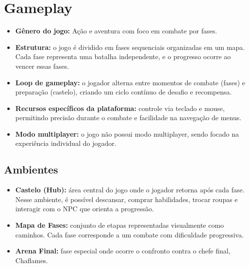\documentclass[12pt,a4paper]{article}
\begin{document}
\newpage


\section*{Gameplay}

\begin{itemize}
    \item \textbf{Gênero do jogo:} Ação e aventura com foco em combate por fases.
    
    \item \textbf{Estrutura:} o jogo é dividido em fases sequenciais organizadas em um mapa.
    Cada fase representa uma batalha independente, e o progresso ocorre ao vencer essas fases.
    
    \item \textbf{Loop de gameplay:} o jogador alterna entre momentos de combate (fases)
    e preparação (castelo), criando um ciclo contínuo de desafio e recompensa.
    
    \item \textbf{Recursos específicos da plataforma:} controle via teclado e mouse,
    permitindo precisão durante o combate e facilidade na navegação de menus.
    
    \item \textbf{Modo multiplayer:} o jogo não possui modo multiplayer, sendo focado
    na experiência individual do jogador.
\end{itemize}

\newpage


\subsection*{Ambientes}

\begin{itemize}
    \item \textbf{Castelo (Hub):} área central do jogo onde o jogador retorna após cada fase.
    Nesse ambiente, é possível descansar, comprar habilidades, trocar roupas e interagir
    com o NPC que orienta a progressão.
    
    \item \textbf{Mapa de Fases:} conjunto de etapas representadas visualmente como caminhos.
    Cada fase corresponde a um combate com dificuldade progressiva.
    
    \item \textbf{Arena Final:} fase especial onde ocorre o confronto contra o chefe final,
    Chaflames.
\end{itemize}
\end{document}
